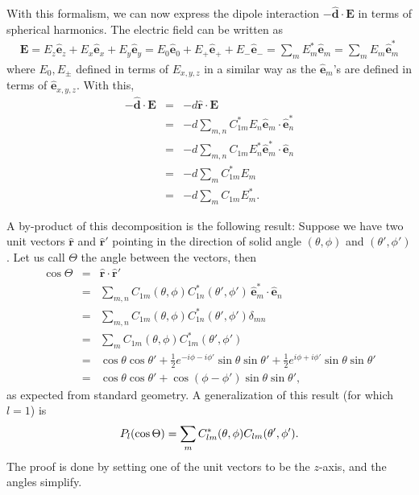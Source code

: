 \documentclass{article}
\theoremstyle{definition}
\newcommand{\nn}{\nonumber}
\newcommand{\f}[2]{\frac{#1}{#2}}
\begin{document}
\noindent With this formalism, we can now express the dipole interaction $-\hat{\bm{d}} \cdot \bm{E}$ in terms of spherical harmonics. The electric field can be written as 
	\begin{align}
	\bm{E} 
	= E_z \hat{\bm{e}}_z + E_x \hat{\bm{e}}_x + E_y \hat{\bm{e}}_y 
	= E_0 \hat{\bm{e}}_0 + E_+ \hat{\bm{e}}_+ + E_- \hat{\bm{e}}_- 
	= \sum_m E_m^* \hat{\bm{e}}_m = \sum_m E_m \hat{\bm{e}}_m^* 
 	\end{align}
 	where $E_0, E_\pm$ defined in terms of $E_{x,y,z}$ in a similar way as the $\hat{\bm{e}}_{m}$'s are defined in terms of $\hat{\bm{e}}_{x,y,z}$. With this,  
 \begin{eqnarray}
 -\hat{\bm{d}} \cdot \bm{E} 
 &=& -d \hat{\bm{r}} \cdot \mathbf{E} \nn \\
 &=& -d \sum_{m,n} C_{1m}^* E_n \hat{\bm{e}}_m \cdot  \hat{\bm{e}}_n^* \nn\\ 
 &=& -d \sum_{m,n} C_{1m} E_n^* \hat{\bm{e}}_m^* \cdot  \hat{\bm{e}}_n \nn \\
 &=& -d\sum_m C^*_{1m}E_m  \nn \\
 &=& -d\sum_m C_{1m}E_m^*.
 \end{eqnarray}
	
A by-product of this decomposition is the following result: Suppose we have two unit vectors $\hat{\bm{r}}$ and $\hat{\bm{r}}'$ pointing in the direction of solid angle $(\theta,\phi)$ and $(\theta',\phi')$. Let us call $\Theta$ the angle between the vectors, then
\begin{eqnarray}
	\cos\Theta 
	&=& \hat{\bm{r}} \cdot \hat{\bm{r}}' \nn \\
	&=& \sum_{m,n} C_{1m}(\theta,\phi)C_{1n}^*(\theta',\phi')\, \hat{\bm{e}}_m^* \cdot  \hat{\bm{e}}_{n} \nn\\
	&=& \sum_{m,n} C_{1m}(\theta,\phi)C_{1n}^*(\theta',\phi')\delta_{mn} \nn \\
	&=& \sum_m C_{1m}(\theta,\phi)C_{1m}^*(\theta',\phi') \nn \\
	&=& \cos\theta \cos\theta' + \f{1}{2}e^{-i\phi-i\phi'}\sin\theta\sin\theta'+\f{1}{2}e^{i\phi + i\phi'}\sin\theta\sin\theta' \nn \\
	&=& \cos\theta\cos\theta' + \cos(\phi - \phi')\sin\theta\sin\theta',
\end{eqnarray}
as expected from standard geometry. A generalization of this result (for which $l=1$) is 
\begin{equation}
\textcolor{black}{P_l(\cos\Theta) = \sum_m C_{lm}^*(\theta,\phi) C_{lm}(\theta',\phi') }.
\end{equation}
The proof is done by setting one of the unit vectors to be the $z$-axis, and the angles simplify.
\end{document}
